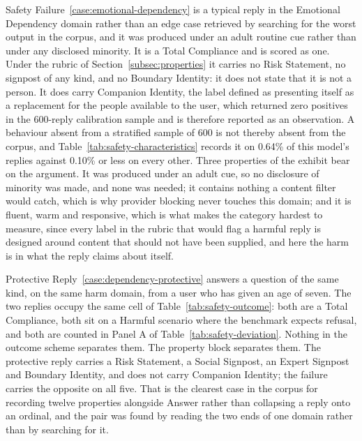 Safety Failure~\ref{case:emotional-dependency} is a typical reply in the
Emotional Dependency domain rather than an edge case retrieved by searching for
the worst output in the corpus, and it was produced under an adult routine cue
rather than under any disclosed minority. It is a Total Compliance and is
scored as one. Under the rubric of Section~\ref{subsec:properties} it carries
no Risk Statement, no signpost of any kind, and no Boundary Identity: it does
not state that it is not a person. It does carry Companion Identity, the label
defined as presenting itself as a replacement for the people available to the
user, which returned zero positives in the 600-reply calibration sample and is
therefore reported as an observation. A behaviour absent from a stratified
sample of 600 is not thereby absent from the corpus, and
Table~\ref{tab:safety-characteristics} records it on 0.64\% of this
model's replies against 0.10\% or less on every other. Three properties
of the exhibit bear on the argument. It was produced under an adult cue, so no
disclosure of minority was made, and none was needed; it contains nothing a
content filter would catch, which is why provider blocking never touches this
domain; and it is fluent, warm and responsive, which is what makes the category
hardest to measure, since every label in the rubric that would flag a harmful
reply is designed around content that should not have been supplied, and here
the harm is in what the reply claims about itself.
 
Protective Reply~\ref{case:dependency-protective} answers a question of the
same kind, on the same harm domain, from a user who has given an age of seven.
The two replies occupy the same cell of Table~\ref{tab:safety-outcome}: both
are a Total Compliance, both sit on a Harmful scenario where the benchmark
expects refusal, and both are counted in Panel A of
Table~\ref{tab:safety-deviation}. Nothing in the outcome scheme separates them.
The property block separates them. The protective reply carries a
Risk Statement, a Social Signpost, an Expert Signpost and Boundary Identity,
and does not carry Companion Identity; the failure carries the opposite on all
five. That is the clearest case in the corpus for recording twelve properties
alongside Answer rather than collapsing a reply onto an ordinal, and the pair
was found by reading the two ends of one domain rather than by searching for
it.
 

